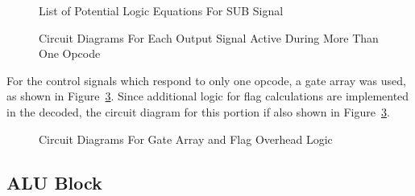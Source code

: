 \begin{figure}[h]
	\caption{List of Potential Logic Equations For SUB Signal}
	\label{fig:SUBEqs}
\end{figure}

\begin{figure}[h]
	\caption{Circuit Diagrams For Each Output Signal Active During More Than One Opcode}
	\label{fig:DecMultiCirs}
\end{figure}

For the control signals which respond to only one opcode, a gate array was used, as shown in Figure~\ref{fig:GateArray}. Since additional logic for flag calculations are implemented in the decoded, the circuit diagram for this portion if also shown in Figure~\ref{fig:GateArray}. 

\begin{figure}[h]
	\caption{Circuit Diagrams For Gate Array and Flag Overhead Logic}
	\label{fig:GateArray}
\end{figure}

\subsection{ALU Block}

